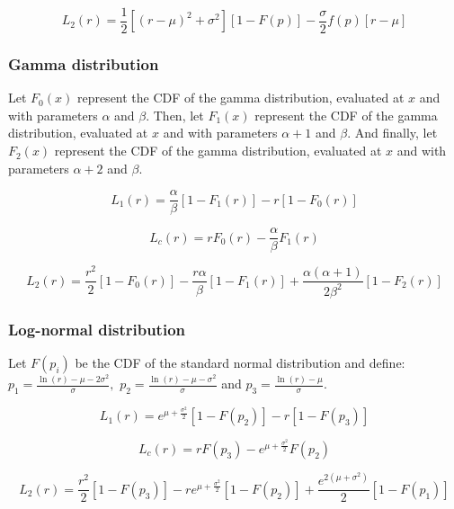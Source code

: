 \documentclass{article}
\begin{document}
\begin{equation}
    L_2(r) = \frac{1}{2}[(r-\mu)^2+\sigma^2][1-F(p)]-\frac{\sigma}{2}f(p)[r-\mu]
\end{equation}

\subsubsection{Gamma distribution}

Let $F_0(x)$ represent the CDF of the gamma distribution, evaluated at $x$ and with parameters $\alpha$ and $\beta$.
Then, let $F_1(x)$ represent the CDF of the gamma distribution, evaluated at $x$ and with parameters $\alpha+1$ and $\beta$.
And finally, let $F_2(x)$ represent the CDF of the gamma distribution, evaluated at $x$ and with parameters $\alpha+2$ and $\beta$.

\begin{equation}
    L_1(r) = \frac{\alpha}{\beta}[1-F_1(r)]-r[1-F_0(r)]
\end{equation}

\begin{equation}
    L_c(r) = rF_0(r)-\frac{\alpha}{\beta}F_1(r)
\end{equation}

\begin{equation}
    L_2(r) = \frac{r^2}{2}[1-F_0(r)]-\frac{r\alpha}{\beta}[1-F_1(r)]+\frac{\alpha(\alpha+1)}{2\beta^2 }[1-F_2(r)]
\end{equation}

\subsubsection{Log-normal distribution}

Let $F(p_i)$ be the CDF of the standard normal distribution and define:
$p_1 = \frac{\ln(r)-\mu-2\sigma^2}{\sigma},$
$p_2 = \frac{\ln(r)-\mu-\sigma^2}{\sigma}$
and
$p_3 = \frac{\ln(r)-\mu}{\sigma}.$

\begin{equation}
    L_1(r) = e^{\mu+\frac{\sigma^2}{2}}[1-F(p_2)]-r[1-F(p_3)]
\end{equation}

\begin{equation}
    L_c(r) = rF(p_3)-e^{\mu+\frac{\sigma^2}{2}}F(p_2)
\end{equation}

\begin{equation}
    L_2(r) = \frac{r^2}{2}[1-F(p_3)]-re^{\mu+\frac{\sigma^2}{2}}[1-F(p_2)]+\frac{e^{2\left(\mu+\sigma^2\right)}}{2}[1-F(p_1)]
\end{equation}
\end{document}
